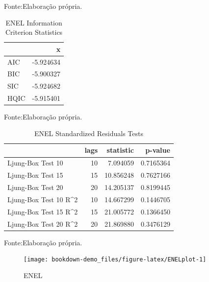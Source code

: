 \documentclass[
  12pt,
  a4paper,
  openany]{book}
\begin{document}
Fonte:Elaboração própria.

\justifying
\bigskip

\begin{table}[!h]

\caption{\label{tab:unnamed-chunk-24}ENEL Information Criterion Statistics}
\centering
\begin{tabular}[t]{lr}
\toprule
  & x\\
\midrule
AIC & -5.924634\\
BIC & -5.900327\\
SIC & -5.924682\\
HQIC & -5.915401\\
\bottomrule
\end{tabular}
\end{table}
\FloatBarrier
\centering

Fonte:Elaboração própria.

\justifying
\bigskip

\begin{table}[!h]

\caption{\label{tab:unnamed-chunk-25}ENEL Standardized Residuals Tests}
\centering
\begin{tabular}[t]{lrrr}
\toprule
  & lags & statistic & p-value\\
\midrule
Ljung-Box Test 10 & 10 & 7.094059 & 0.7165364\\
Ljung-Box Test 15 & 15 & 10.856248 & 0.7627166\\
Ljung-Box Test 20 & 20 & 14.205137 & 0.8199445\\
Ljung-Box Test 10 R\textasciicircum{}2 & 10 & 14.667299 & 0.1446705\\
Ljung-Box Test 15 R\textasciicircum{}2 & 15 & 21.005772 & 0.1366450\\
\addlinespace
Ljung-Box Test 20 R\textasciicircum{}2 & 20 & 21.869880 & 0.3476129\\
\bottomrule
\end{tabular}
\end{table}
\FloatBarrier
\centering

Fonte:Elaboração própria.

\justifying
\bigskip
\begin{figure}

{\centering \texttt{[image: bookdown-demo\_files/figure-latex/ENELplot-1]} 

}

\caption{ENEL}\label{fig:ENELplot}
\end{figure}
\FloatBarrier
\centering
\end{document}

